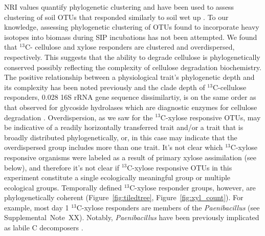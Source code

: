 NRI values quantify phylogenetic clustering \citep{Webb2000} and have 
been used to assess clustering of soil OTUs that responded similarly to soil
wet up \citep{Evans2014a,Placella2012}. To our knowledge, assessing
phylogenetic clustering of OTUs found to incorporate heavy isotopes into
biomass during SIP incubations has not been attempted. We found that $^{13}$C-
cellulose and xylose responders are clustered and overdispersed, respectively.
This suggests that the ability to degrade cellulose is phylogenetically
conserved possibly reflecting the complexity of cellulose degradation
biochemistry. The positive relationship between a physiological trait's
phylogenetic depth and its complexity has been noted previously
\citep{Martiny2013a} and the clade depth of $^{13}$C-cellulose responders,
0.028 16S rRNA gene sequence dissimilartiy, is on the same order as that
observed for glycoside hydrolases which are diagnostic enzymes for cellulose
degradation \citep{Berlemont2013}. Overdispersion, as we saw for the
$^{13}$C-xylose responsive OTUs, may be indicative of a readily horizontally
transferred trait and/or a trait that is broadly distributed phylogenetically,
or, in this case may indicate that the overdispersed group includes more than
one trait. It's not clear which $^{13}$C-xylose responsive organisms were
labeled as a result of primary xylose assimilation (see below), and therefore
it's not clear if $^{13}$C-xylose responsive OTUs in this experiment constitute
a single ecologically meaningful group or multiple ecological groups.
Temporally defined $^{13}$C-xylose responder groups, however, are
phylogenetically coherent (Figure~\ref{fig:tiledtree},
Figure~\ref{fig:xyl_count}). For example, most day
1 $^{13}$C-xylose responders are members of the \textit{Paenibacillus} (see
Supplemental~Note~XX). Notably, \textit{Paenibacillus} have been previously
implicated as labile C decomposers \citep{Verastegui_2014}.

